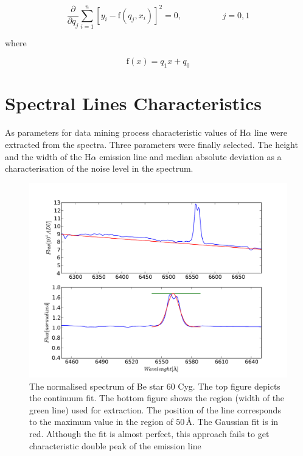 \documentclass[11pt,twoside]{article}
\begin{document}
\begin{equation}
  \frac{\partial}{\partial q_j} \sum_{i = 1}^n{[y_i -
    \textrm{f}(q_j, x_i) ]^2} = 0,\hspace{2cm} j = 0,1
\end{equation}

where 

\begin{equation}
\textrm{f}(x) = q_1x + q_0  
\end{equation}


\section{Spectral Lines Characteristics}
As parameters for data mining process characteristic values of
H$\alpha$ line were extracted from the spectra. Three parameters were
finally selected. The height and the width of the H$\alpha$ emission
line and median absolute deviation as a characterisation of the noise
level in the spectrum.


\begin{center}
\vspace{-10pt}
\begin{figure}[!htbp]
  \begin{center}
    \leavevmode
    \includegraphics[scale = .5]{figSpecCharCyg60}
    \caption{The normalised spectrum of Be star 60 Cyg. The top figure
      depicts the continuum fit. The bottom figure shows the region
      (width of the green line) used for extraction. The position of
      the line corresponds to the maximum value in the region of
      $50\,\textrm{\AA}$. The Gaussian fit is in red. Although the fit
      is almost perfect, this approach fails to get characteristic
      double peak of the emission line}
    \label{FigConvolution}
  \end{center}
\end{figure}
\vspace{-10pt}
\end{center}
\end{document}
